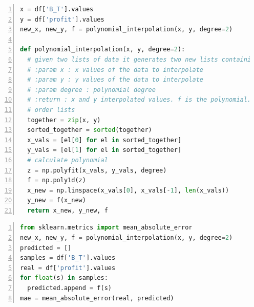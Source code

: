 \documentclass[USenglish]{uit-thesis}
\begin{document}
\begin{appendices}
\begin{lstlisting}[float, numbers=left,frame=single,caption={Polynomial interpolation on miner's profit, $\langle \Pi \rangle$, and creation time, $\mathcal{T}$, using Numpy libraries.},language=Python]
x = df['B_T'].values
y = df['profit'].values
new_x, new_y, f = polynomial_interpolation(x, y, degree=2)

def polynomial_interpolation(x, y, degree=2):
  # given two lists of data it generates two new lists containing the y values interpolated
  # :param x : x values of the data to interpolate
  # :param y : y values of the data to interpolate
  # :param degree : polynomial degree
  # :return : x and y interpolated values. f is the polynomial.
  # order lists
  together = zip(x, y)
  sorted_together = sorted(together)
  x_vals = [el[0] for el in sorted_together]
  y_vals = [el[1] for el in sorted_together]
  # calculate polynomial
  z = np.polyfit(x_vals, y_vals, degree)
  f = np.poly1d(z)
  x_new = np.linspace(x_vals[0], x_vals[-1], len(x_vals))
  y_new = f(x_new)
  return x_new, y_new, f
\end{lstlisting}





\begin{lstlisting}[float, numbers=left,frame=single,caption={\gls{mae} accuracy calculation on miner's profit $\langle \Pi \rangle$ calculated using scikit-learn libraries in Python.},language=Python]
from sklearn.metrics import mean_absolute_error
new_x, new_y, f = polynomial_interpolation(x, y, degree=2)
predicted = []
samples = df['B_T'].values
real = df['profit'].values
for float(s) in samples:
  predicted.append = f(s)
mae = mean_absolute_error(real, predicted)
\end{lstlisting}


\end{appendices}
\end{document}
